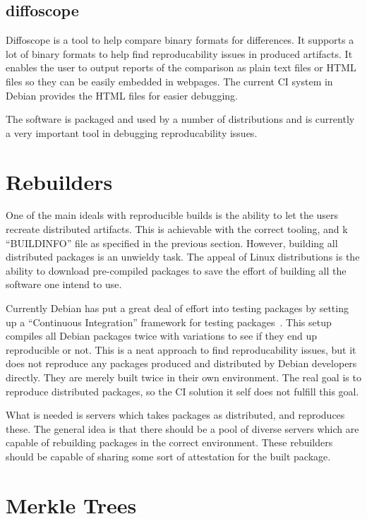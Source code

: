 \documentclass[../Main/thesis.tex]{subfiles}
\begin{document}
\subsection*{diffoscope}
Diffoscope is a tool to help compare binary formats for differences. It supports
a lot of binary formats to help find reproducability issues in produced
artifacts. It enables the user to output reports of the comparison as plain text
files or HTML files so they can be easily embedded in webpages. The current CI
system in Debian provides the HTML files for easier debugging.

The software is packaged and used by a number of distributions and is currently
a very important tool in debugging reproducability issues.


\section{Rebuilders}\label{sec:rebuilders} 
One of the main ideals with reproducible builds is the ability to let the users
recreate distributed artifacts. This is achievable with the correct tooling, and
k ``BUILDINFO'' file as specified in the previous section. However, building all
distributed packages is an unwieldy task. The appeal of Linux distributions is
the ability to download pre-compiled packages to save the effort of building all
the software one intend to use.

Currently Debian has put a great deal of effort into testing packages by setting
up a ``Continuous Integration'' framework for testing packages~\cite{debian-ci}. This setup
compiles all Debian packages twice with variations to see if they end up
reproducible or not. This is a neat approach to find reproducability issues, but
it does not reproduce any packages produced and distributed by Debian developers
directly. They are merely built twice in their own environment. The real goal is
to reproduce distributed packages, so the CI solution it self does not fulfill
this goal.

What is needed is servers which takes packages as distributed, and reproduces
these. The general idea is that there should be a pool of diverse servers which
are capable of rebuilding packages in the correct environment. These rebuilders
should be capable of sharing some sort of attestation for the built package.


\section{Merkle Trees}%
\label{sec:merkle_trees}
\end{document}
